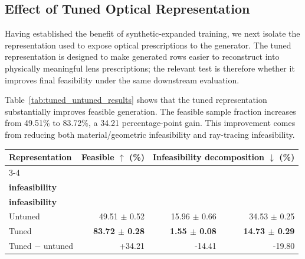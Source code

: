 \subsection{Effect of Tuned Optical Representation}
\label{sec:results_tuned_representation}

Having established the benefit of synthetic-expanded training, we next isolate the representation used to expose optical prescriptions to the generator. The tuned representation is designed to make generated rows easier to reconstruct into physically meaningful lens prescriptions; the relevant test is therefore whether it improves final feasibility under the same downstream evaluation.

Table~\ref{tab:tuned_untuned_results} shows that the tuned representation substantially improves feasible generation. The feasible sample fraction increases from 49.51\% to 83.72\%, a 34.21 percentage-point gain. This improvement comes from reducing both material/geometric infeasibility and ray-tracing infeasibility.

\begin{center}
\begin{minipage}{0.98\linewidth}
\centering
\scriptsize
\setlength{\tabcolsep}{4pt}
\label{tab:tuned_untuned_results}
\begin{tabular}{lrrr}
\toprule
\textbf{Representation} & \textbf{Feasible $\uparrow$ (\%)} & \multicolumn{2}{c}{\textbf{Infeasibility decomposition $\downarrow$ (\%)}} \\
\cmidrule(lr){3-4}
 & & \shortstack{\textbf{Material/geometric}\\\textbf{infeasibility}} & \shortstack{\textbf{Ray-tracing}\\\textbf{infeasibility}} \\
\midrule
Untuned & 49.51 \ensuremath{\pm} 0.52 & 15.96 \ensuremath{\pm} 0.66 & 34.53 \ensuremath{\pm} 0.25 \\
Tuned & \textbf{83.72 \ensuremath{\pm} 0.28} & \textbf{1.55 \ensuremath{\pm} 0.08} & \textbf{14.73 \ensuremath{\pm} 0.29} \\
\midrule
Tuned $-$ untuned & +34.21 & -14.41 & -19.80 \\
\bottomrule
\end{tabular}
\end{minipage}
\end{center}

